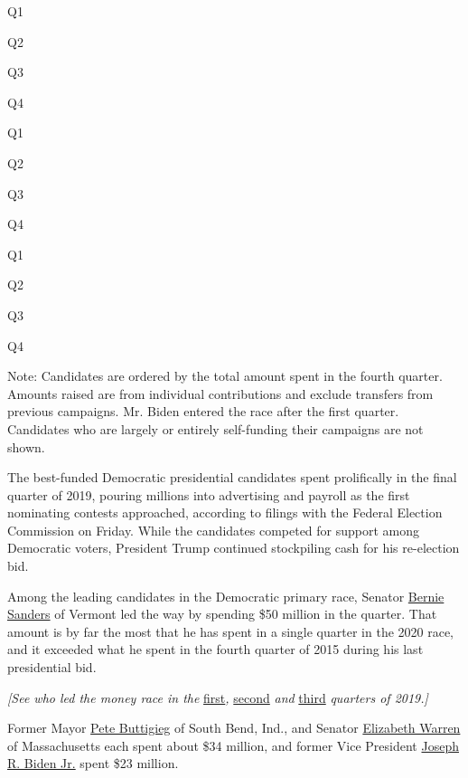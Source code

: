 Q1

Q2

Q3

Q4

Q1

Q2

Q3

Q4

Q1

Q2

Q3

Q4

Note: Candidates are ordered by the total amount spent in the fourth
quarter. Amounts raised are from individual contributions and exclude
transfers from previous campaigns. Mr. Biden entered the race after the
first quarter. Candidates who are largely or entirely self-funding their
campaigns are not shown.

The best-funded Democratic presidential candidates spent prolifically in
the final quarter of 2019, pouring millions into advertising and payroll
as the first nominating contests approached, according to filings with
the Federal Election Commission on Friday. While the candidates competed
for support among Democratic voters, President Trump continued
stockpiling cash for his re-election bid.

Among the leading candidates in the Democratic primary race, Senator
\href{https://www.nytimes.com/interactive/2020/us/elections/bernie-sanders.html}{Bernie
Sanders} of Vermont led the way by spending \$50 million in the quarter.
That amount is by far the most that he has spent in a single quarter in
the 2020 race, and it exceeded what he spent in the fourth quarter of
2015 during his last presidential bid.

\emph{{[}See who led the money race in the}
\href{https://www.nytimes.com/interactive/2019/us/politics/campaign-finance-2020-fundraising.html}{first}\emph{,}
\href{https://www.nytimes.com/interactive/2019/07/16/us/politics/democratic-fundraising-2020.html}{second}
\emph{and}
\href{https://www.nytimes.com/interactive/2019/10/16/us/elections/democratic-q3-fundraising.html}{third}
\emph{quarters of 2019.{]}}

Former Mayor
\href{https://www.nytimes.com/interactive/2020/us/elections/pete-buttigieg.html}{Pete
Buttigieg} of South Bend, Ind., and Senator
\href{https://www.nytimes.com/interactive/2020/us/elections/elizabeth-warren.html}{Elizabeth
Warren} of Massachusetts each spent about \$34 million, and former Vice
President
\href{https://www.nytimes.com/interactive/2020/us/elections/joe-biden.html}{Joseph
R. Biden Jr.} spent \$23 million.

